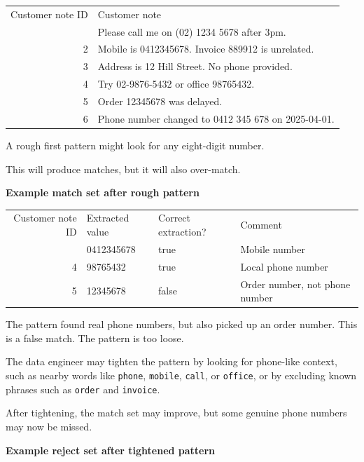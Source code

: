 \documentclass[10pt,openany,10pt]{book}
\newcounter{none}
\let\podeToprule\toprule
\let\podeMidrule\midrule
\let\podeBottomrule\bottomrule
\renewcommand{\toprule}{\arrayrulecolor{pbiGrid}\podeToprule}
\renewcommand{\midrule}{\arrayrulecolor{pbiGrid}\podeMidrule}
\renewcommand{\bottomrule}{\arrayrulecolor{pbiGrid}\podeBottomrule}
\begin{document}
{\def\LTcaptype{none} %
\begin{longtable}[]{@{}rl@{}}
\toprule\noalign{}
Customer note ID & Customer note \\
\midrule\noalign{}
\endhead
\bottomrule\noalign{}
\endlastfoot
1 & Please call me on (02) 1234 5678 after 3pm. \\
2 & Mobile is 0412345678. Invoice 889912 is unrelated. \\
3 & Address is 12 Hill Street. No phone provided. \\
4 & Try 02-9876-5432 or office 98765432. \\
5 & Order 12345678 was delayed. \\
6 & Phone number changed to 0412 345 678 on 2025-04-01. \\
\end{longtable}
}

A rough first pattern might look for any eight-digit number.

This will produce matches, but it will also over-match.

\textbf{Example match set after rough pattern}

{\def\LTcaptype{none} %
\begin{longtable}[]{@{}rlll@{}}
\toprule\noalign{}
Customer note ID & Extracted value & Correct extraction? & Comment \\
\midrule\noalign{}
\endhead
\bottomrule\noalign{}
\endlastfoot
2 & 0412345678 & true & Mobile number \\
4 & 98765432 & true & Local phone number \\
5 & 12345678 & false & Order number, not phone number \\
\end{longtable}
}

The pattern found real phone numbers, but also picked up an order
number. This is a false match. The pattern is too loose.

The data engineer may tighten the pattern by looking for phone-like
context, such as nearby words like \texttt{phone}, \texttt{mobile},
\texttt{call}, or \texttt{office}, or by excluding known phrases such as
\texttt{order} and \texttt{invoice}.

After tightening, the match set may improve, but some genuine phone
numbers may now be missed.

\textbf{Example reject set after tightened pattern}
\end{document}
